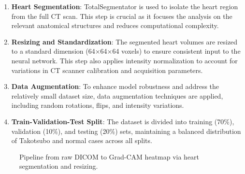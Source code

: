 \documentclass[12pt, BSc]{muthesis}
\begin{document}
\begin{enumerate}

    \item \textbf{Heart Segmentation}: TotalSegmentator is used to isolate the heart region from the full CT scan. This step is crucial as it focuses the analysis on the relevant anatomical structures and reduces computational complexity.

    \item \textbf{Resizing and Standardization}: The segmented heart volumes are resized to a standard dimension (64×64×64 voxels) to ensure consistent input to the neural network. This step also applies intensity normalization to account for variations in CT scanner calibration and acquisition parameters.

    \item \textbf{Data Augmentation}: To enhance model robustness and address the relatively small dataset size, data augmentation techniques are applied, including random rotations, flips, and intensity variations.

    \item \textbf{Train-Validation-Test Split}: The dataset is divided into training (70\%), validation (10\%), and testing (20\%) sets, maintaining a balanced distribution of Takotsubo and normal cases across all splits.
\end{enumerate}


\begin{figure}[H]
\centering
{}
\caption{Pipeline from raw DICOM to Grad-CAM heatmap via heart segmentation and resizing.}
\end{figure}
\end{document}
